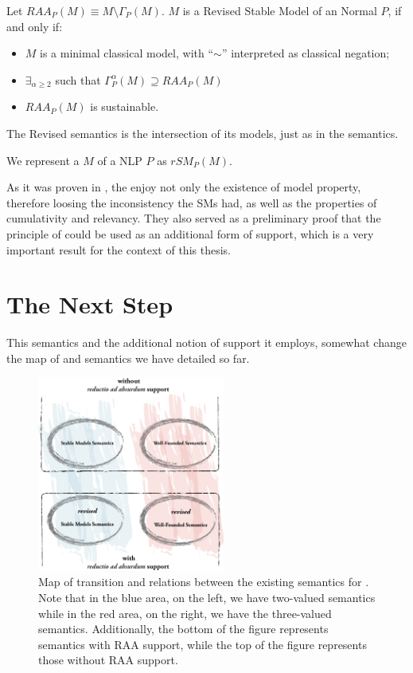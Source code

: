 \begin{definition}
\label{def:rsms}
Let $RAA_{P}(M)\equiv M\setminus\Gamma_{P}(M)$. $M$ is a Revised Stable Model of an Normal \LP $P$, if and
only if:
\begin{itemize}
\item $M$ is a minimal classical model, with ``$\sim$'' interpreted as classical
negation;
\item $\exists_{\alpha\ge 2}$ such that $\Gamma_{P}^{\alpha}(M)\supseteq
RAA_{P}(M)$
\item $RAA_{P}(M)$ is sustainable.
\end{itemize}

The Revised \SMs semantics is the intersection of its models, just as in the \sms semantics.

We represent a \rsm $M$ of a NLP $P$ as $rSM_{P}(M)$.
\end{definition}

As it was proven in \cite{ampMSc}, the \rsms enjoy not only the existence of model property, therefore loosing the inconsistency the SMs had, as well as the properties of cumulativity and relevancy. They also served as a preliminary proof that the principle of \raa could be used as an additional form of support, which is a very important result for the context of this thesis.


\section{The Next Step}
This semantics and the additional notion of support it employs, somewhat change the map of \kr and \nmr semantics we have detailed so far.


\begin{figure}[htbp]
	\centering
		\includegraphics[width=0.55\textwidth]{Chap2/transitions.png}
	\caption{\footnotesize Map of transition and relations between the existing semantics for \nlps. Note that in the blue area, on the left, we have two-valued semantics while in the red area, on the right, we have the three-valued semantics. Additionally, the bottom of the figure represents semantics with RAA support, while the top of the figure represents those without RAA support.}
	\label{fig:transitions}
\end{figure}



